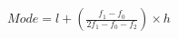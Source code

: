 \documentclass[preview]{standalone}
\begin{document}
\begin{align*}
\begin{array}{l}Mode = l + \left ( \frac{f_{1}-f_{0}}{2f_{1}-f_{0}-f_{2}} \right )\times h\end{array}
\end{align*}
\end{document}
